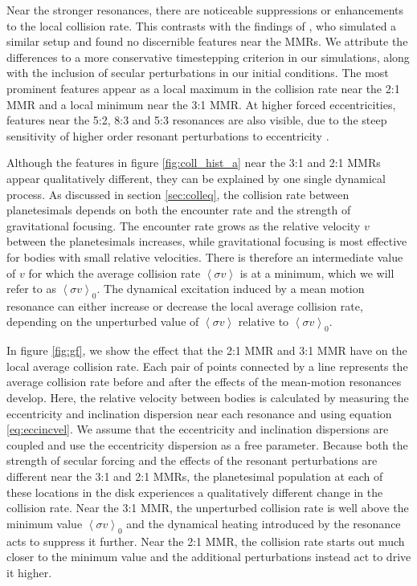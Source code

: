 Near the stronger resonances, there are noticeable suppressions or enhancements to the local collision rate. This contrasts with 
the findings of \cite{richardson00}, who simulated a similar setup and found no discernible features near the MMRs. We attribute 
the differences to a more conservative timestepping criterion in our simulations, along with the inclusion of secular perturbations 
in our initial conditions. The most prominent features appear as a local maximum in the collision rate near the 2:1 MMR and a 
local minimum near the 3:1 MMR. At higher forced eccentricities, features near the 5:2, 8:3 and 5:3 resonances are also visible, 
due to the steep sensitivity of higher order resonant perturbations to eccentricity \cite{malhotra94}.

Although the features in figure \ref{fig:coll_hist_a} near the 3:1 and 2:1 MMRs appear qualitatively different, they can be 
explained by one single dynamical process. As discussed in section \ref{sec:colleq}, the collision rate between planetesimals 
depends on both the encounter rate and the strength of gravitational focusing. The encounter rate grows as the relative velocity 
$v$ between the planetesimals increases, while gravitational focusing is most effective for bodies with small relative velocities. 
There is therefore an intermediate value of $v$ for which the average collision rate $\left< \sigma v \right>$ is at a minimum, 
which we will refer to as  $\left< \sigma v \right>_{0}$. The dynamical excitation induced by a mean motion resonance can either 
increase or decrease the local average collision rate, depending on the unperturbed value of  $\left< \sigma v \right>$ relative to  
$\left< \sigma v \right>_{0}$.

In figure \ref{fig:gf}, we show the effect that the 2:1 MMR and 3:1 MMR have on the local average collision rate. Each pair of 
points connected by a line represents the average collision rate before and after the effects of the mean-motion resonances 
develop. Here, the relative velocity between bodies is calculated by measuring the eccentricity and inclination dispersion near 
each resonance and using equation \ref{eq:eccincvel}. We assume that the eccentricity and inclination dispersions are coupled 
\cite{ida93a} and use the eccentricity dispersion as a free parameter. Because both the strength of secular forcing and the 
effects of the resonant perturbations are different near the 3:1 and 2:1 MMRs, the planetesimal population at each of these 
locations in the disk experiences a qualitatively different change in the collision rate. Near the 3:1 MMR, the unperturbed collision 
rate is well above the minimum value $\left< \sigma v \right>_{0}$ and the dynamical heating introduced by the resonance acts 
to suppress it further. Near the 2:1 MMR, the collision rate starts out much closer to the minimum value and the additional 
perturbations instead act to drive it higher.

